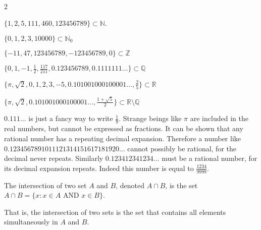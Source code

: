 \documentclass[crop=false,class=article,oneside]{standalone}
\begin{document}
        \begin{example}
            \
            \begin{enumerate}
            \end{enumerate}
        \end{example}
        \begin{remark}
            $0.111\hdots$ is just a fancy way to write $\frac{1}{9}$.
            Strange beings like $\pi$ are included in the real numbers,
            but cannot be expressed as fractions. It can be shown that
            any rational number has a repeating decimal expansion.
            Therefore a number like $0.1234567891011121314151617181920\hdots$
            cannot possibly be rational, for the decimal never repeats.
            Similarly $0.123412341234\hdots$ must be a rational number,
            for its decimal expansion repeats.
            Indeed this number is equal to $\frac{1234}{9999}$.
        \end{remark}
        \begin{definition}
            The intersection of two set $A$ and $B$, denoted $A\cap{B}$,
            is the set $A\cap{B}=\{x:x\in{A}\textrm{ AND }x\in{B}\}$.
        \end{definition}
        \begin{remark}
            That is, the intersection of two sets is the set that
            contains all elements simultaneously in $A$ and $B$.
        \end{remark}
\end{document}
